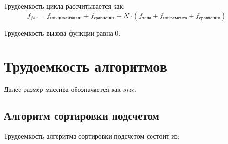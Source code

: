 Трудоемкость цикла рассчитывается как:
\begin{equation}
	\label{for:for}
	f_{for} = f_{\text{инициализации}} + f_{\text{сравнения}} + N \cdot (f_{\text{тела}} + f_{\text{инкремента}} + f_{\text{сравнения}})
\end{equation}

Трудоемкость вызова функции равна 0.

\section{Трудоемкость алгоритмов}

Далее размер массива обозначается как $size$.

\subsection{Алгоритм сортировки подсчетом}

Трудоемкость алгоритма сортировки подсчетом состоит из:

